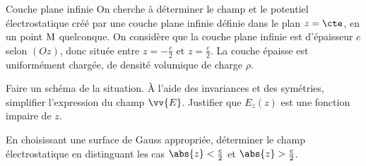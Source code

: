 \begin{exo}[PC][2][TD]{Couche plane infinie}%
  On cherche à déterminer le champ et le potentiel électrostatique créé par une couche plane infinie définie dans le plan $z=\cte$, en un point $\rm M$ quelconque.
On considère que la couche plane infinie est d’épaisseur $e$ selon $(Oz)$, donc située entre $z=-\textstyle\frac{e}{2}$ et $z=\textstyle\frac{e}{2}$. La couche épaisse est uniformément chargée, de densité volumique de charge $\rho$.
\begin{quest}
  \item Faire un schéma de la situation. À l'aide des invariances et des symétries, simplifier l'expression du champ $\vv{E}$. Justifier que $E_z(z)$ est une fonction impaire de $z$.
  \item En choisissant une surface de Gauss appropriée, déterminer le champ électrostatique en distinguant les cas $\abs{z}<\frac{e}{2}$ et $\abs{z}>\frac{e}{2}$.
\end{quest}
\end{exo}
